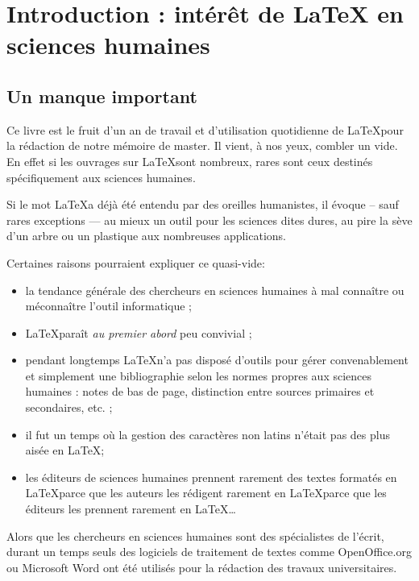 \chapter[Introduction]{Introduction : intérêt de \LaTeX{} en sciences humaines}

\section{Un manque important}

Ce livre est le fruit d'un an de travail et d'utilisation quotidienne de \LaTeX pour la rédaction de notre mémoire de master. Il vient, à nos yeux,  combler un vide. En effet si les ouvrages sur \LaTeX sont nombreux, rares sont ceux destinés  spécifiquement aux sciences humaines. 

Si le mot \LaTeX a déjà été entendu par des oreilles humanistes, il évoque -- sauf rares exceptions --- au mieux un outil pour les sciences dites dures, au pire la sève d'un arbre ou un plastique aux nombreuses applications. 

Certaines raisons pourraient expliquer ce quasi-vide:
\begin{itemize}
\item la tendance générale des chercheurs en sciences humaines à mal connaître ou méconnaître l'outil informatique ;
\item \LaTeX paraît \emph{au premier abord} peu convivial ;
\item pendant longtemps \LaTeX n'a pas disposé d'outils pour gérer convenablement et simplement une bibliographie selon les normes propres aux sciences humaines : notes de bas de page, distinction entre sources primaires et secondaires, etc. ;
\item il fut un temps où la gestion des caractères non latins n'était pas des plus aisée en \LaTeX ;
\item les éditeurs de sciences humaines prennent rarement des textes formatés en \LaTeX parce que les auteurs les rédigent rarement en \LaTeX parce que les éditeurs les prennent rarement en \LaTeX \ldots
\end{itemize}

Alors que les chercheurs en sciences humaines sont des spécialistes de l'écrit, durant un temps seuls des logiciels de traitement de textes comme OpenOffice.org ou Microsoft Word ont été utilisés pour la rédaction des travaux universitaires.

